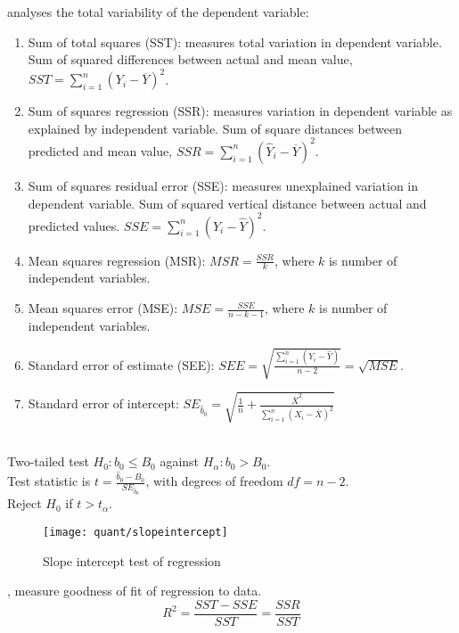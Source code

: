 \begin{definition}  analyses the total variability of the dependent variable:
\begin{enumerate}[label=\roman*.]
\setlength{\itemsep}{0pt}
\item Sum of total squares (SST): measures total variation in dependent variable. Sum of squared differences between actual and mean value, $SST = \sum\limits_{i=1}^n (Y_i - \overline{Y})^2$.
\item Sum of squares regression (SSR): measures variation in dependent variable as explained by independent variable. Sum of square distances between predicted and mean value, $SSR = \sum\limits_{i=1}^n (\hat{Y}_i - \overline{Y})^2$.
\item Sum of squares residual error (SSE): measures unexplained variation in dependent variable. Sum of squared vertical distance between actual and predicted values. $SSE = \sum\limits_{i=1}^n (Y_i - \hat{Y})^2$.
\item Mean squares regression (MSR): $MSR = \frac{SSR}{k}$, where $k$ is number of independent variables.
\item Mean squares error (MSE): $MSE = \frac{SSE}{n-k-1}$, where $k$ is number of independent variables.
\item Standard error of estimate (SEE): $SEE = \sqrt{\frac{\sum\limits_{i=1}^n (Y_i - \hat{Y})}{n-2}} = \sqrt{MSE}$.
\item Standard error of intercept: $SE_{\hat{b}_0} = \sqrt{\frac{1}{n} + \frac{\overline{X}^2}{\sum\limits_{i=1}^n(X_i - \overline{X})^2}}$
\end{enumerate}
\end{definition}

\begin{definition} \\
Two-tailed test $H_0: b_0 \leq B_0$ against $H_{\alpha} : b_0 > B_0$.\\
Test statistic is $t = \frac{\hat{b}_0 - B_0}{SE_{\hat{b}_0}}$, with degrees of freedom $df = n-2$.\\
Reject $H_0$ if $t > t_{\alpha}$.
\end{definition}

\begin{figure}[H]
\centering
\texttt{[image: quant/slopeintercept]}
\caption{Slope intercept test of regression}
\end{figure}

\begin{definition} , measure goodness of fit of regression to data.
\begin{equation}
R^2 = \frac{SST - SSE}{SST} = \frac{SSR}{SST} \nonumber
\end{equation}
\end{definition}

